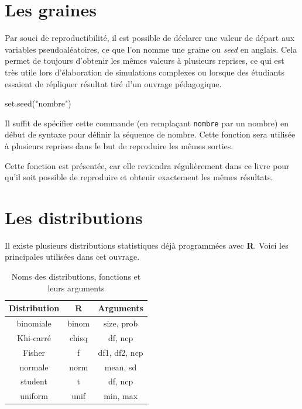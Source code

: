 \documentclass[
]{book}
\newenvironment{Shaded}{}{}
\newcommand{\FunctionTok}[1]{#1}
\newcommand{\NormalTok}[1]{#1}
\newcommand{\StringTok}[1]{#1}
\begin{document}
\hypertarget{les-graines}{%
\section{Les graines}\label{les-graines}}

Par souci de reproductibilité, il est possible de déclarer une valeur de départ aux variables pseudoaléatoires, ce que l'on nomme une graine ou \emph{seed} en anglais. Cela permet de toujours d'obtenir les mêmes valeurs à plusieurs reprises, ce qui est très utile lors d'élaboration de simulations complexes ou lorsque des étudiants essaient de répliquer résultat tiré d'un ouvrage pédagogique.

\begin{Shaded}
\begin{Highlighting}[]
\FunctionTok{set.seed}\NormalTok{(}\StringTok{"nombre"}\NormalTok{)}
\end{Highlighting}
\end{Shaded}

Il suffit de spécifier cette commande (en remplaçant \texttt{nombre} par un nombre) en début de syntaxe pour définir la séquence de nombre. Cette fonction sera utilisée à plusieurs reprises dans le but de reproduire les mêmes sorties.

Cette fonction est présentée, car elle reviendra régulièrement dans ce livre pour qu'il soit possible de reproduire et obtenir exactement les mêmes résultats.

\hypertarget{les-distributions}{%
\section{Les distributions}\label{les-distributions}}

Il existe plusieurs distributions statistiques déjà programmées avec \textbf{R}. Voici les principales utilisées dans cet ouvrage.

\begin{table}[H]

\caption{\label{tab:unnamed-chunk-13}Noms des distributions, fonctions et leurs arguments}
\centering
\begin{tabular}[t]{ccc}
\toprule
Distribution & R & Arguments\\
\midrule
binomiale & binom & size, prob\\
Khi-carré & chisq & df, ncp\\
Fisher & f & df1, df2, ncp\\
normale & norm & mean, sd\\
student & t & df, ncp\\
\addlinespace
uniform & unif & min, max\\
\bottomrule
\end{tabular}
\end{table}
\end{document}
